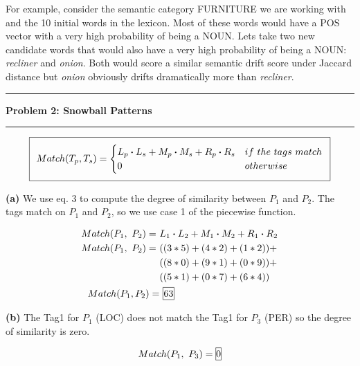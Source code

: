 \documentclass[11pt]{article}
\newcommand\question[2]{\vspace{.25in}\hrule\textbf{#1: #2}\vspace{.5em}\hrule\vspace{.10in}}
\renewcommand\part[1]{\vspace{.10in}\textbf{(#1)}}
\begin{document}
For example, consider the semantic category FURNITURE we are working with and the 10 initial words in the lexicon. Most of these words would have a POS vector with a very high probability of being a NOUN. Lets take two new candidate words that would also have a very high probability of being a NOUN: \textit{recliner} and \textit{onion}. Both would score a similar semantic drift score under Jaccard distance but \textit{onion} obviously drifts dramatically more than \textit{recliner}.
\question{Problem 2}{Snowball Patterns}

\begin{equation}
\setlength\fboxsep{0.25cm}
\setlength\fboxrule{0.4pt}
\boxed{Match(T_p, T_s) = 
	\begin{cases} 
      	L_p \boldsymbol{\cdot} L_s + M_p \boldsymbol{\cdot} M_s + R_p \boldsymbol{\cdot} R_s & if \ the \ tags \ match \\
      	0 & otherwise \\
	\end{cases}
}
\end{equation}

\part{a} We use eq. 3 to compute the degree of similarity between $P_1$ and $P_2$. The tags match on $P_1$ and $P_2$, so we use case 1 of the piecewise function.

\begin{align*}
Match(P_1, \ P_2) = \ &L_1 \boldsymbol{\cdot} L_2 + M_1 \boldsymbol{\cdot} M_2 + R_1 \boldsymbol{\cdot} R_2  \\ Match(P_1, \ P_2) = \ &((3 * 5) + (4 * 2) + (1 * 2)) + \\ & ((8 * 0) + (9 * 1) + (0 * 9)) + \\ & ((5 * 1) + (0 * 7) + (6 * 4))\\Match(P_1, P_2) = & \ \framebox[1.2\width]{63}
\end{align*}

\part{b} The Tag1 for $P_1$ (LOC) does not match the Tag1 for $P_3$ (PER) so the degree of similarity is zero.

\begin{align*}
Match(P_1, \ P_3) = \framebox[1.2\width]{0}
\end{align*}
\end{document}
